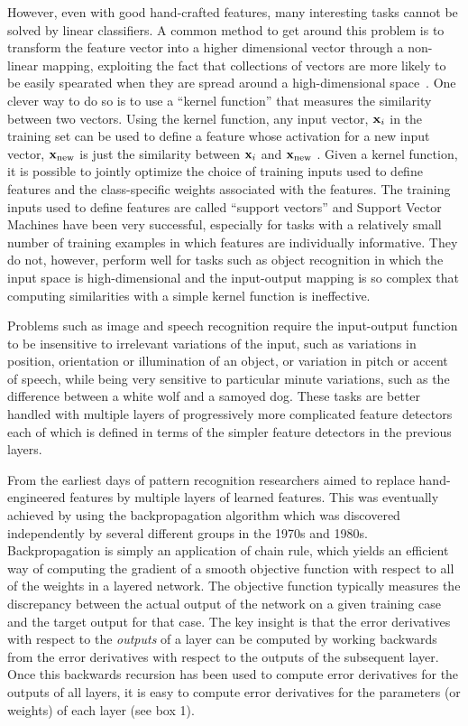 \documentclass[]{article}
\begin{document}
However, even with good hand-crafted features, many interesting tasks
cannot be solved by linear classifiers. A common method to get around this
problem is to transform the feature vector into a higher dimensional vector
through a non-linear mapping, exploiting the fact that collections of
vectors are more likely to be easily spearated when they are spread around
a high-dimensional space~\cite{cover}. One clever way to do so is to use a
``kernel function'' that measures the similarity between two vectors.
Using the kernel function, any input vector, ${\bf x}_i$ in the training
set can be used to define a feature whose activation for a new input
vector, ${\bf x}_{\rm new}$ is just the similarity between ${\bf x}_i$ and
${\bf x}_{\rm new}$ . Given a kernel function, it is possible to jointly
optimize the choice of training inputs used to define features and the
class-specific weights associated with the features\cite{}. The training
inputs used to define features are called ``support vectors'' and Support
Vector Machines\cite{Vapnik} have been very successful, especially for
tasks with a relatively small number of training examples in which features
are individually informative. They do not, however, perform well for tasks
such as object recognition in which the input space is high-dimensional and
the input-output mapping is so complex that computing similarities with a
simple kernel function is ineffective.

Problems such as image and speech recognition require the input-output
function to be insensitive to irrelevant variations of the input, such as
variations in position, orientation or illumination of an object, or
variation in pitch or accent of speech, while being very sensitive to
particular minute variations, such as the difference between a white wolf
and a samoyed dog. These tasks are better handled with multiple layers of
progressively more complicated feature detectors each of which is defined
in terms of the simpler feature detectors in the previous layers.

From the earliest days of pattern recognition\cite{selfridge, rosenblatt}
researchers aimed to replace hand-engineered features by multiple layers of
learned features.  This was eventually achieved by using the
backpropagation algorithm which was discovered independently by several
different groups in the 1970s and 1980s\cite{Werbos, Parker, Lecun,
  Rumelhart, schmidreference}.  Backpropagation is simply an application of
chain rule, which yields an efficient way of computing the gradient of a
smooth objective function with respect to all of the weights in a layered
network. The objective function typically measures the discrepancy between
the actual output of the network on a given training case and the target
output for that case.  The key insight is that the error derivatives with
respect to the {\it outputs} of a layer can be computed by working
backwards from the error derivatives with respect to the outputs of the
subsequent layer. Once this backwards recursion has been used to compute
error derivatives for the outputs of all layers, it is easy to compute
error derivatives for the parameters (or weights) of each layer (see box
1).
\end{document}
